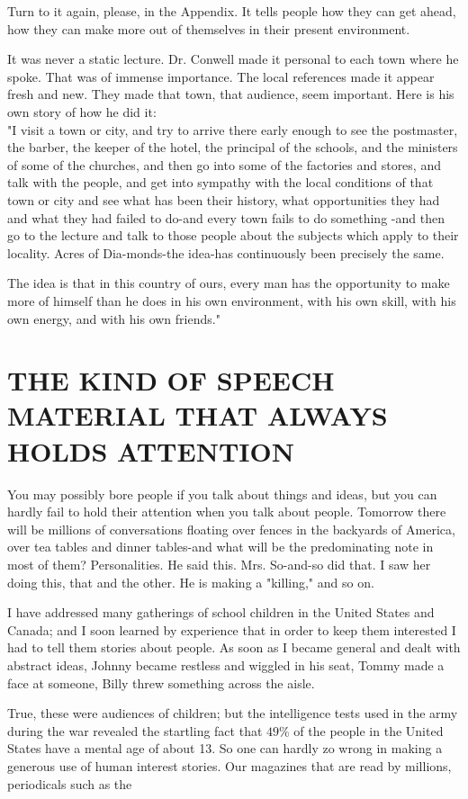 \documentclass[10pt]{article}
\begin{document}
Turn to it again, please, in the Appendix. It tells people how they can get ahead, how they can make more out of themselves in their present environment.

It was never a static lecture. Dr. Conwell made it personal to each town where he spoke. That was of immense importance. The local references made it appear fresh and new. They made that town, that audience, seem important. Here is his own story of how he did it:\\
"I visit a town or city, and try to arrive there early enough to see the postmaster, the barber, the keeper of the hotel, the principal of the schools, and the ministers of some of the churches, and then go into some of the factories and stores, and talk with the people, and get into sympathy with the local conditions of that town or city and see what has been their history, what opportunities they had and what they had failed to do-and every town fails to do something -and then go to the lecture and talk to those people about the subjects which apply to their locality. Acres of Dia-monds-the idea-has continuously been precisely the same.

The idea is that in this country of ours, every man has the opportunity to make more of himself than he does in his own environment, with his own skill, with his own energy, and with his own friends."

\section*{THE KIND OF SPEECH MATERIAL THAT ALWAYS HOLDS ATTENTION}
You may possibly bore people if you talk about things and ideas, but you can hardly fail to hold their attention when you talk about people. Tomorrow there will be millions of conversations floating over fences in the backyards of America, over tea tables and dinner tables-and what will be the predominating note in most of them? Personalities. He said this. Mrs. So-and-so did that. I saw her doing this, that and the other. He is making a "killing," and so on.

I have addressed many gatherings of school children in the United States and Canada; and I soon learned by experience that in order to keep them interested I had to tell them stories about people. As soon as I became general and dealt with abstract ideas, Johnny became restless and wiggled in his seat, Tommy made a face at someone, Billy threw something across the aisle.

True, these were audiences of children; but the intelligence tests used in the army during the war revealed the startling fact that $49 \%$ of the people in the United States have a mental age of about 13. So one can hardly zo wrong in making a generous use of human interest stories. Our magazines that are read by millions, periodicals such as the
\end{document}
